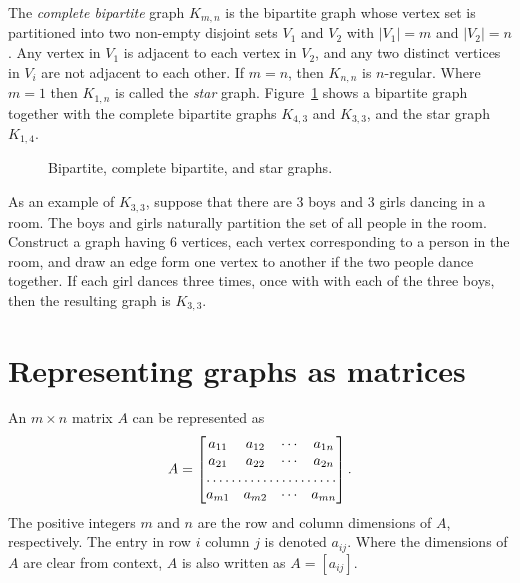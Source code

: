 The \emph{complete bipartite} graph $K_{m,n}$ is the bipartite graph
whose vertex set is partitioned into two non-empty disjoint sets $V_1$
and $V_2$ with $|V_1| = m$ and $|V_2| = n$. Any vertex in $V_1$ is
adjacent to each vertex in $V_2$, and any two distinct vertices in
$V_i$ are not adjacent to each other. If $m = n$, then $K_{n,n}$ is
$n$-regular. Where $m = 1$ then $K_{1,n}$ is called the \emph{star}
graph. Figure~\ref{fig:introduction:bipartite_complete_bipartite_graphs}
shows a bipartite graph together with the complete bipartite graphs
$K_{4,3}$ and $K_{3,3}$, and the star graph $K_{1,4}$.

\begin{figure}[!htbp]
\centering

\caption{Bipartite, complete bipartite, and star graphs.}
\label{fig:introduction:bipartite_complete_bipartite_graphs}
\end{figure}

As an example of $K_{3,3}$, suppose that there are $3$ boys and $3$
girls dancing in a room. The boys and girls naturally partition the
set of all people in the room. Construct a graph having $6$ vertices,
each vertex corresponding to a person in the room, and draw an edge
form one vertex to another if the two people dance together. If each
girl dances three times, once with with each of the three boys, then
the resulting graph is $K_{3,3}$.



\section{Representing graphs as matrices}
\label{sec:introduction:matrix_representation}

An $m \times n$ matrix $A$ can be represented as
\[
A
=
\begin{bmatrix}
a_{11} & a_{12} & \cdots & a_{1n} \\
a_{21} & a_{22} & \cdots & a_{2n} \\
\hdotsfor{4} \\
a_{m1} & a_{m2} & \cdots & a_{mn} \\
\end{bmatrix}.
\]
The positive integers $m$ and $n$ are the row and column dimensions of
$A$, respectively. The entry in row $i$ column $j$ is denoted
$a_{ij}$. Where the dimensions of $A$ are clear from context, $A$ is
also written as $A = [a_{ij}]$.

